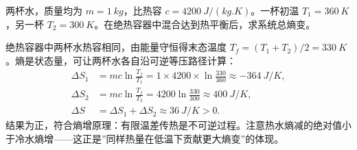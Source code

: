 \documentclass[lang=cn,11pt]{elegantbook}
\begin{document}
\begin{exercise}
两杯水，质量均为 \(m=\SI{1}{kg}\)，比热容 \(c=\SI{4200}{J/(kg.K)}\)。一杯初温 \(T_1=\SI{360}{K}\)，另一杯 \(T_2=\SI{300}{K}\)。在绝热容器中混合达到热平衡后，求系统总熵变。
\end{exercise}
\begin{solution}
绝热容器中两杯水热容相同，由能量守恒得末态温度 \(T_f=(T_1+T_2)/2=\SI{330}{K}\)。熵是状态量，可让两杯水各自沿可逆等压路径计算：
\[
\begin{aligned}
\Delta S_1&=mc\ln\frac{T_f}{T_1}
=1\times4200\times\ln\frac{330}{360}
\approx\SI{-364}{J/K},\\
\Delta S_2&=mc\ln\frac{T_f}{T_2}
=4200\ln\frac{330}{300}
\approx\SI{+400}{J/K},\\
\Delta S&=\Delta S_1+\Delta S_2
\approx\SI{+36}{J/K}>0.
\end{aligned}
\]
结果为正，符合熵增原理：有限温差传热是不可逆过程。注意热水熵减的绝对值小于冷水熵增——这正是”同样热量在低温下贡献更大熵变”的体现。
\end{solution}
\end{document}
